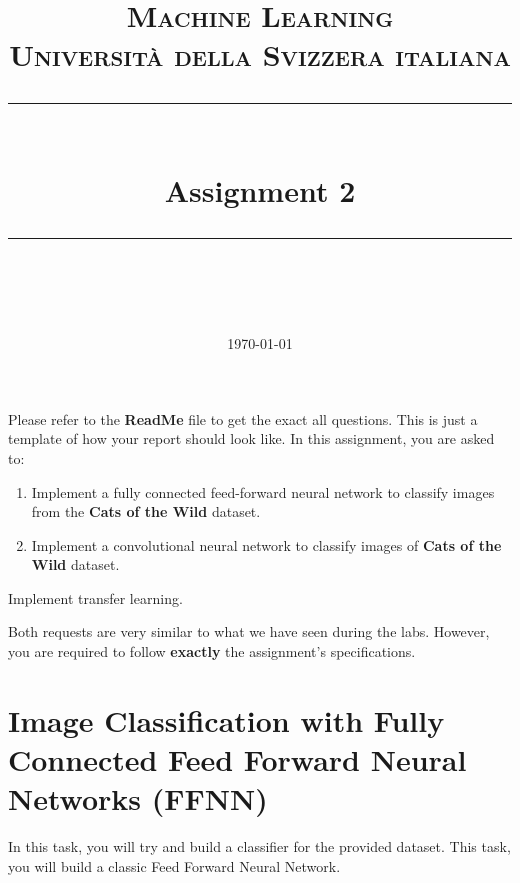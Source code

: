 \documentclass[11pt]{scrartcl}
\title{	
	\normalfont\normalsize
	\textsc{Machine Learning\\%
	Universit\`a della Svizzera italiana}\\
	\vspace{25pt}
	\rule{\linewidth}{0.5pt}\\
	\vspace{20pt}
	{\huge Assignment 2}\\
	\vspace{12pt}
	\rule{\linewidth}{1pt}\\
	\vspace{12pt}
}
\author{\LARGE \thestudent}
\date{\normalsize\today}
\begin{document}
\maketitle

Please refer to the \textbf{ReadMe} file to get the exact all questions. This is just a template of how your report should look like.
In this assignment, you are asked to:

\begin{enumerate}
\item Implement a fully connected feed-forward neural network to classify images from the \textbf{Cats of the Wild} dataset.

\item Implement a convolutional neural network to classify images of \textbf{Cats of the Wild} dataset.
\end{enumerate}

\item Implement transfer learning.

Both requests are very similar to what we have seen during the labs. However, you are required to follow \textbf{exactly} the assignment's specifications.

\section{Image Classification with Fully Connected Feed Forward Neural Networks (FFNN)}

In this task, you will try and build a classifier for the provided dataset. This task, you will build a classic Feed Forward Neural Network.
\end{document}
